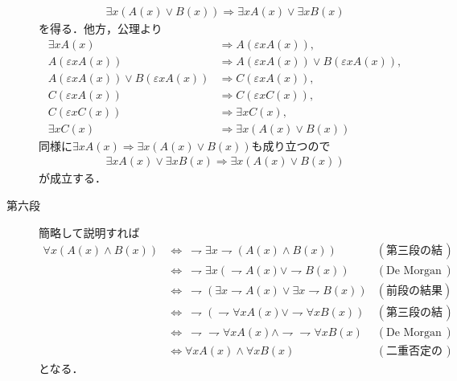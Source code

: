 \begin{prf}
\begin{description}
\begin{align}
			\exists x ( A(x) \vee B(x) ) \Longrightarrow \exists x A(x) \vee \exists x B(x)
		\end{align}
		を得る．他方，公理より
		\begin{align}
			\exists x A(x) &\Longrightarrow A(\varepsilon x A(x)), \\
			A(\varepsilon x A(x)) &\Longrightarrow A(\varepsilon x A(x)) \vee B(\varepsilon x A(x)), \\
			A(\varepsilon x A(x)) \vee B(\varepsilon x A(x)) &\Longrightarrow C(\varepsilon x A(x)), \\
			C(\varepsilon x A(x)) &\Longrightarrow C(\varepsilon x C(x)), \\
			C(\varepsilon x C(x)) &\Longrightarrow \exists x C(x), \\
			\exists x C(x) &\Longrightarrow \exists x (A(x) \vee B(x))
		\end{align}
		同様に$\exists x A(x) \Longrightarrow \exists x (A(x) \vee B(x))$も成り立つので
		\begin{align}
			\exists x A(x) \vee \exists x B(x) \Longrightarrow \exists x (A(x) \vee B(x))
		\end{align}
		が成立する．
			
			\item[第六段]
				簡略して説明すれば
				\begin{align}
					\forall x \left( A(x) \wedge B(x) \right)
					&\Longleftrightarrow\ \rightharpoondown \exists x \rightharpoondown \left( A(x) \wedge B(x) \right) & (\mbox{第三段の結果の対偶}) \\
					&\Longleftrightarrow\ \rightharpoondown \exists x \left( \rightharpoondown A(x) \vee \rightharpoondown B(x) \right) & (\mbox{De Morganの法則}) \\
					&\Longleftrightarrow\ \rightharpoondown \left( \exists x \rightharpoondown A(x) \vee \exists x \rightharpoondown B(x) \right) & (\mbox{前段の結果}) \\
					&\Longleftrightarrow\ \rightharpoondown \left( \rightharpoondown \forall x A(x) \vee \rightharpoondown \forall x B(x) \right) & (\mbox{第三段の結果}) \\
					&\Longleftrightarrow\ \rightharpoondown \rightharpoondown \forall x A(x) \wedge \rightharpoondown \rightharpoondown \forall x B(x) & (\mbox{De Morganの法則}) \\
					&\Longleftrightarrow \forall x A(x) \wedge \forall x B(x) &(\mbox{二重否定の法則})
				\end{align}
				となる．
				\QED
		\end{description}
	\end{prf}
	
